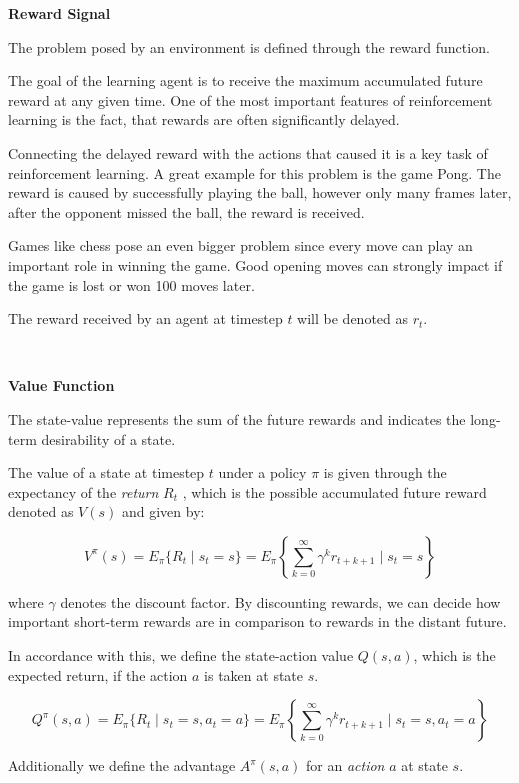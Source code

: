 \textbf{Reward Signal}

The problem posed by an environment is defined through the reward function. 

The goal of the learning agent is to receive the maximum accumulated future reward at any given time. One of the most important features of reinforcement learning is the fact, that rewards are often significantly delayed. 

Connecting the delayed reward with the actions that caused it is a key task of reinforcement learning.
A great example for this problem is the game Pong. The reward is caused by successfully playing the ball, however only many frames later, after the opponent missed the ball, the reward is received.

Games like chess pose an even bigger problem since every move can play an important role in winning the game. Good opening moves can strongly impact if the game is lost or won 100 moves later.

The reward received by an agent at timestep $t$ will be denoted as $r_t$.

\ 

\textbf{Value Function}

The state-value represents the sum of the future rewards and indicates the long-term desirability of a state.

The value of a state at timestep $t$ under a policy $\pi$ is given through the expectancy of the \textit{return} $R_t$ , which is the possible accumulated future reward denoted as $V(s)$ and given by:

\begin{equation}
{
V^\pi (s) = E_\pi \{R_t \mid s_t = s\} = E_\pi \left\{ \sum_{k=0}^\infty \gamma^k r_{t+k+1} \mid s_t = s \right\}
}
\end{equation}

where $\gamma$ denotes the discount factor. By discounting rewards, we can decide how important short-term rewards are in comparison to rewards in the distant future.

In accordance with this, we define the state-action value $Q(s,a)$, which is the expected return, if the action $a$ is taken at state $s$.

\begin{equation}
{
Q^\pi (s,a) = E_\pi \{R_t \mid s_t = s, a_t = a\} = E_\pi \left\{ \sum_{k=0}^\infty \gamma^k r_{t+k+1} \mid s_t = s, a_t = a \right\}
}
\end{equation}

Additionally we define the advantage $A^\pi(s,a)$ for an \textit{action} $a$ at state $s$.

